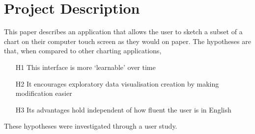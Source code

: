 \section{Project Description}
This paper describes an application that allows the user to sketch a subset of a chart on their computer touch screen as they would on paper. The hypotheses are that, when compared to other charting applications,

\begin{enumerate}
\item[H1] This interface is more `learnable' over time
\item[H2] It encourages exploratory data visualisation creation by making modification easier
\item[H3] Its advantages hold independent of how fluent the user is in English
\end{enumerate}

These hypotheses were investigated through a user study.

